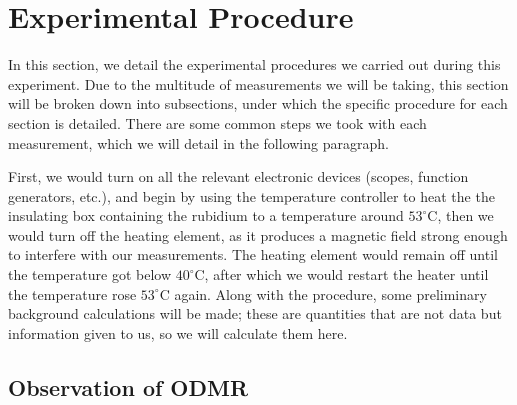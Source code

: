 \documentclass[10pt]{article}
\begin{document}
	\section{Experimental Procedure}

	In this section, we detail the experimental procedures we carried out during this
	experiment. Due to the multitude of measurements we will be taking, this section
	will be broken down into subsections, under which the specific procedure for each 
	section is detailed. There are some common steps we took with each measurement,
	which we will detail in the following paragraph. 

	First, we would turn on all the relevant electronic devices (scopes, function
	generators, etc.), and begin by using the temperature controller to heat the
	the insulating box containing the rubidium to a temperature around \( 53^{\circ}
	\)C, then we would turn off the heating element, as it produces a magnetic field
	strong enough to interfere with our measurements. The heating element would
	remain off until the temperature got below \( 40^{\circ} \)C, after which we
	would restart the heater until the temperature rose \( 53^{\circ} \)C again.           
	Along with the procedure, some preliminary background calculations
	will be made; these are quantities that are not data but information given to us,
	so we will calculate them here. 

	\subsection{Observation of ODMR}
\end{document}
